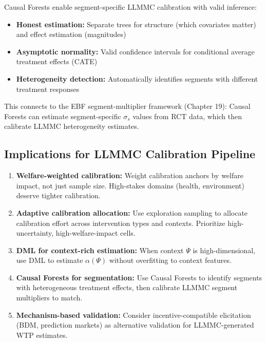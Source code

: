 Causal Forests \citep{athey2016recursive, wager2018causalforest} enable
segment-specific LLMMC calibration with valid inference:

\begin{itemize}
\item \textbf{Honest estimation:} Separate trees for structure (which covariates
matter) and effect estimation (magnitudes)

\item \textbf{Asymptotic normality:} Valid confidence intervals for conditional
average treatment effects (CATE)

\item \textbf{Heterogeneity detection:} Automatically identifies segments with
different treatment responses
\end{itemize}

This connects to the EBF segment-multiplier framework (Chapter 19): Causal Forests
can estimate segment-specific $\sigma_s$ values from RCT data, which then calibrate
LLMMC heterogeneity estimates.

\subsection{Implications for LLMMC Calibration Pipeline}

\begin{enumerate}
\item \textbf{Welfare-weighted calibration:}
Weight calibration anchors by welfare impact, not just sample size.
High-stakes domains (health, environment) deserve tighter calibration.

\item \textbf{Adaptive calibration allocation:}
Use exploration sampling to allocate calibration effort across intervention
types and contexts. Prioritize high-uncertainty, high-welfare-impact cells.

\item \textbf{DML for context-rich estimation:}
When context $\Psi$ is high-dimensional, use DML to estimate $\alpha(\Psi)$
without overfitting to context features.

\item \textbf{Causal Forests for segmentation:}
Use Causal Forests to identify segments with heterogeneous treatment effects,
then calibrate LLMMC segment multipliers to match.

\item \textbf{Mechanism-based validation:}
Consider incentive-compatible elicitation (BDM, prediction markets) as
alternative validation for LLMMC-generated WTP estimates.
\end{enumerate}

